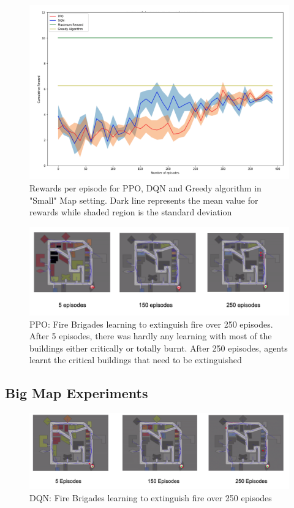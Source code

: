 \documentclass[12pt]{report}
\begin{document}
\begin{figure}[!h]
    \centering
    \includegraphics[width=12cm]{29.png}
    \caption{Rewards per episode for PPO, DQN and Greedy algorithm in "Small" Map setting. Dark line represents the mean value for rewards while shaded region is the standard deviation}
    \label{fig:SmallMapResults}
\end{figure}

\begin{figure}[!h]
    \centering
    \includegraphics[width=14cm]{PPO.png}
    \caption{PPO: Fire Brigades learning to extinguish fire over 250 episodes. After 5 episodes, there was hardly any learning with most of the buildings either critically or totally burnt. After 250 episodes, agents learnt the critical buildings that need to be extinguished}
    \label{fig:PPOLearningSmallMap}
\end{figure}

\subsection{Big Map Experiments}


\begin{figure}[!h]
    \centering
    \includegraphics[width=14cm]{DQN.png}
    \caption{DQN: Fire Brigades learning to extinguish fire over 250 episodes}
    \label{fig:DQNLearningSmallMap}
\end{figure}
\end{document}
